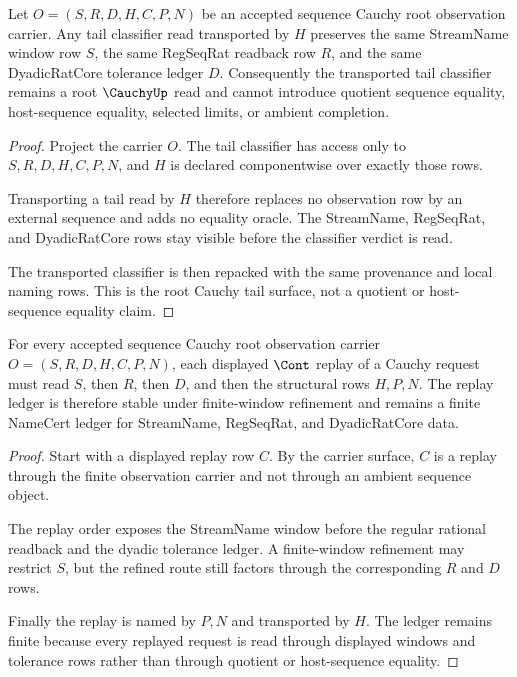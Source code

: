 \begin{theorem}
\label{thm:sequence-cauchy-hsame-stable-tail-classifier}
Let $O=(S,R,D,H,C,P,N)$ be an accepted sequence Cauchy root observation carrier. Any tail classifier read transported by $H$ preserves the same StreamName window row $S$, the same RegSeqRat readback row $R$, and the same DyadicRatCore tolerance ledger $D$. Consequently the transported tail classifier remains a root $\CauchyUp$ read and cannot introduce quotient sequence equality, host-sequence equality, selected limits, or ambient completion.
\end{theorem}
\begin{proof}
Project the carrier $O$. The tail classifier has access only to $S,R,D,H,C,P,N$, and $H$ is declared componentwise over exactly those rows.

Transporting a tail read by $H$ therefore replaces no observation row by an external sequence and adds no equality oracle. The StreamName, RegSeqRat, and DyadicRatCore rows stay visible before the classifier verdict is read.

The transported classifier is then repacked with the same provenance and local naming rows. This is the root Cauchy tail surface, not a quotient or host-sequence equality claim.
\end{proof}

\begin{theorem}
\label{thm:sequence-cauchy-cont-stable-replay-ledger}
For every accepted sequence Cauchy root observation carrier $O=(S,R,D,H,C,P,N)$, each displayed $\Cont$ replay of a Cauchy request must read $S$, then $R$, then $D$, and then the structural rows $H,P,N$. The replay ledger is therefore stable under finite-window refinement and remains a finite NameCert ledger for StreamName, RegSeqRat, and DyadicRatCore data.
\end{theorem}
\begin{proof}
Start with a displayed replay row $C$. By the carrier surface, $C$ is a replay through the finite observation carrier and not through an ambient sequence object.

The replay order exposes the StreamName window before the regular rational readback and the dyadic tolerance ledger. A finite-window refinement may restrict $S$, but the refined route still factors through the corresponding $R$ and $D$ rows.

Finally the replay is named by $P,N$ and transported by $H$. The ledger remains finite because every replayed request is read through displayed windows and tolerance rows rather than through quotient or host-sequence equality.
\end{proof}
